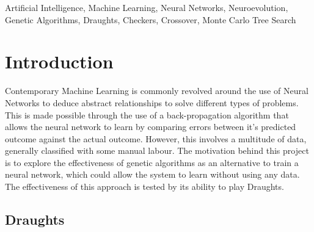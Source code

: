 \documentclass[12pt,a4paper]{article}
\begin{document}
\begin{abstract}
    {\bf Results}

    Overall, the neuroevolutionary approach was shown to learn and improve over time. The net learning rate was positive. However, the wide scope of the adjustments afforded may have impacted the learning rate and was consequently shown to be volatile in some situations. The use of crossovers showed promise, providing a wide range of potential results but on average suggested negligible improvement.

    {\bf Conclusion}

    Neuroevolution can be considered as an option to create a draughts-playing AI, but the robustness of the system is quite volatile. To counteract this, extra precautions should be taken in producing a crossover mechanism that is both safe but exploratory as this could otherwise negatively impact the learning rate.

\end{abstract}
\begin{keywords}
    Artificial Intelligence, Machine Learning, Neural Networks, Neuroevolution, Genetic Algorithms, Draughts, Checkers, Crossover, Monte Carlo Tree Search
\end{keywords}
\section{Introduction}
    Contemporary Machine Learning is commonly revolved around the use of Neural Networks to deduce abstract relationships to solve different types of problems. This is made possible through the use of a back-propagation algorithm that allows the neural network to learn by comparing errors between it's predicted outcome against the actual outcome. \cite{rumelhart_learning_1986} However, this involves a multitude of data, generally classified with some manual labour. The motivation behind this project is to explore the effectiveness of genetic algorithms as an alternative to train a neural network, which could allow the system to learn without using any data. The effectiveness of this approach is tested by its ability to play Draughts.

    \subsection{Draughts}
\end{document}

